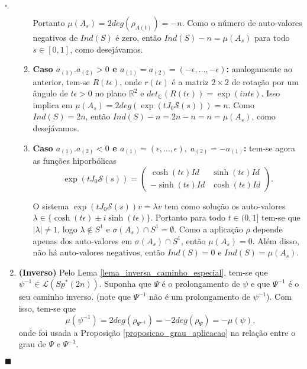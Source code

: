 \documentclass[12pt]{book}
\newenvironment{prova}[1]{$\square$ #1}{\hfill$\blacksquare$}
\newcommand{\caminhos}{\mathcal{L}}
\newcommand{\circulo}{S^{1}}
\newcommand{\complexo}[1]{\mathbb{C}^{#1}}
\newcommand{\espectrooperador}[1]{\sigma(#1)}
\newcommand{\estruturacomplexa}{J_{0}}
\newcommand{\gruposimpleticonaodegenerado}[1]{Sp^{#1}(2n)}
\newcommand{\intervalo}{[0,1]}
\newcommand{\real}[1]{\mathbb{R}^{#1}}
\begin{document}
\begin{prova}
\begin{enumerate}
\begin{enumerate}
				Portanto $\mu(A_{s}) = 2deg(\rho_{A(t)}) = -n$. Como o número de auto-valores negativos de $Ind(S)$ é zero, então  $ Ind(S)-n=\mu(A_{s})$ para todo $s\in \intervalo$, como desejávamos.
				
				\item \textbf{Caso $a_{(1)}.a_{(2)}>0$ e $a_{(1)} = a_{(2)} = (-\epsilon,\dots,-\epsilon)$:} analogamente ao anterior, tem-se $R(t\epsilon)$,  onde $r(t\epsilon)$ é a matriz $2\times 2$ de rotação por um ângulo de $t\epsilon>0$ no plano $\real{2}$ e $det_{\complexo{}}(R(t\epsilon)) = \exp(int\epsilon)$. Isso implica em $\mu(A_{s}) = 2deg(\exp(t\estruturacomplexa \mathcal{S}(s))) = n$. Como $Ind(S) = 2n$, então $ Ind(S)-n = 2n-n = n = \mu(A_{s})$, como desejávamos.
				
				\item \textbf{Caso $a_{(1)}.a_{(2)}<0$ e $a_{(1)}=(\epsilon,\dots,\epsilon), \; a_{(2)} = -a_{(1)}$:} tem-se agora as funções hiporbólicas
				$$
				\exp(t\estruturacomplexa \mathcal{S}(s)) = 
				\left(
				\begin{array}{cc}
				\cosh(t\epsilon)Id & \sinh(t\epsilon)Id
				\\
				-\sinh(t\epsilon)Id & \cosh(t\epsilon)Id
				\end{array}
				\right).
				$$
				
				O sistema $\exp(t\estruturacomplexa \mathcal{S}(s)) v = \lambda v$ tem como solução os auto-valores $\lambda \in \{\cosh(t\epsilon)\pm i\sinh(t\epsilon)\}$. Portanto para todo $t\in (0,1]$ tem-se que $|\lambda| \neq 1$, logo $\lambda \notin \circulo$ e $\espectrooperador{A_{s}}\cap\circulo = \emptyset$. Como a aplicação $\rho$ depende apenas dos auto-valores em $\espectrooperador{A_{s}}\cap\circulo$, então $\mu(A_{s}) = 0$. Além disso, não há auto-valores negativos, então $Ind(S)=0$ e $Ind(S)=\mu(A_{s})$.
			\end{enumerate}
	
			\item \textbf{(Inverso)} Pelo Lema \ref{lema_inversa_caminho_especial}, tem-se que $\psi^{-1} \in \caminhos{(\gruposimpleticonaodegenerado{*})}$. Suponha que $\Psi$ é o prolongamento de $\psi$ e que $\Psi^{-1}$ é o seu caminho inverso. (note que $\Psi^{-1}$ não é um prolongamento de $\psi^{-1}$). Com isso, tem-se que 
			$$
			\mu(\psi^{-1})=2deg(\rho_{\Psi^{-1}}) = -2deg(\rho_{\Psi}) = -\mu(\psi),
			$$
			onde foi usada a Proposição \ref{proposicao_grau_aplicacao} na relação entre o grau de $\Psi$ e $\Psi^{-1}$.
		\end{enumerate}
	\end{prova}
	
\end{document}
